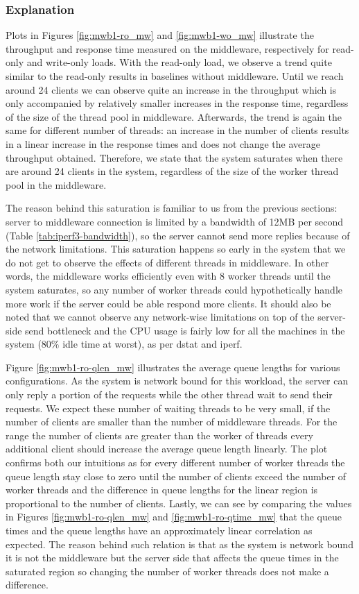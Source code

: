 \documentclass[11pt,a4paper]{article}
\begin{document}
\subsubsection{Explanation} \label{sec:mwb1-exp}
Plots in Figures \ref{fig:mwb1-ro_mw} and \ref{fig:mwb1-wo_mw} illustrate the throughput and response time measured on the middleware, respectively for read-only and write-only loads. With the read-only load, we observe a trend quite similar to the read-only results in baselines without middleware. Until we reach around 24 clients we can observe quite an increase in the throughput which is only accompanied by relatively smaller increases in the response time, regardless of the size of the thread pool in middleware. Afterwards, the trend is again the same for different number of threads: an increase in the number of clients results in a linear increase in the response times and does not change the average throughput obtained. Therefore, we state that the system saturates when there are around 24 clients in the system, regardless of the size of the worker thread pool in the middleware.
\par The reason behind this saturation is familiar to us from the previous sections: server to middleware connection is limited by a bandwidth of 12MB per second (Table \ref{tab:iperf3-bandwidth}), so the server cannot send more replies because of the network limitations. This saturation happens so early in the system that we do not get to observe the effects of different threads in middleware. In other words, the middleware works efficiently even with 8 worker threads until the system saturates, so any number of worker threads could hypothetically handle more work if the server could be able respond more clients. It should also be noted that we cannot observe any network-wise limitations on top of the server-side send bottleneck and the CPU usage is fairly low for all the machines in the system ($80\%$ idle time at worst), as per dstat and iperf. 
\par {} Figure \ref{fig:mwb1-ro-qlen_mw} illustrates the average queue lengths for various configurations. As the system is network bound for this workload, the server can only reply a portion of the requests while the other thread wait to send their requests. We expect these number of waiting threads to be very small, if the number of clients are smaller than the number of middleware threads. For the range the number of clients are greater than the worker of threads every additional client should increase the average queue length linearly. The plot confirms both our intuitions as for every different number of worker threads the queue length stay close to zero until the number of clients exceed the number of worker threads and the difference in queue lengths for the linear region is proportional to the number of clients. Lastly, we can see by comparing the values in Figures \ref{fig:mwb1-ro-qlen_mw} and \ref{fig:mwb1-ro-qtime_mw} that the queue times and the queue lengths have an approximately linear correlation as expected. The reason behind such relation is that as the system is network bound it is not the middleware but the server side that affects the queue times in the saturated region so changing the number of worker threads does not make a difference.
\end{document}
